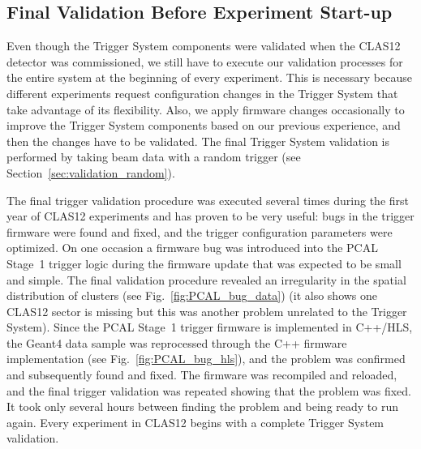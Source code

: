 





\subsection{Final Validation Before Experiment Start-up}

Even though the Trigger System components were validated when the CLAS12 detector was commissioned, we
still have to execute our validation processes for the entire system at the beginning of every experiment. This
is necessary because different experiments request configuration changes in the Trigger System that take
advantage of its flexibility. Also, we apply firmware changes occasionally to improve the Trigger System
components based on our previous experience, and then the changes have to be validated. The final Trigger
System validation is performed by taking beam data with a random trigger (see
Section~\ref{sec:validation_random}).

The final trigger validation procedure was executed several times during the first year of CLAS12 experiments
and has proven to be very useful: bugs in the trigger firmware were found and fixed, and the trigger
configuration parameters were optimized. On one occasion a firmware bug was introduced into the PCAL Stage~1
trigger logic during the firmware update that was expected to be small and simple. The final validation procedure
revealed an irregularity in the spatial distribution of clusters (see Fig.~\ref{fig:PCAL_bug_data}) (it also shows
one CLAS12 sector is missing but this was another problem unrelated to the Trigger System). Since the PCAL
Stage~1 trigger firmware is implemented in C++/HLS, the Geant4 data sample was reprocessed through the
C++ firmware implementation (see Fig.~\ref{fig:PCAL_bug_hls}), and the problem was confirmed and
subsequently found and fixed. The firmware was recompiled and reloaded, and the final trigger validation was
repeated showing that the problem was fixed. It took only several hours between finding the problem and being
ready to run again. Every experiment in CLAS12 begins with a complete Trigger System validation. 

